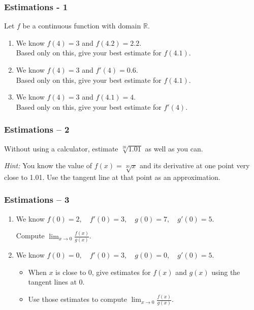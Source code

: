\documentclass[14pt]{beamer}
\begin{document}
\begin{frame}
	\frametitle{Estimations - 1}

	Let $f$ be a continuous function with domain $\mathbb{R}$.

	\vfill

	\begin{enumerate}
		\item We know $f(4)=3$ and $f(4.2)=2.2$. \\ Based only on this, give your best
			estimate for $f(4.1)$.
			\vfill

		\item We know $f(4)=3$ and $f'(4)=0.6$. \\ Based only on this, give your best
			estimate for $f(4.1)$.
			\vfill

		\item We know $f(4)=3$ and $f(4.1) = 4$. \\ Based only on this, give your best
			estimate for $f'(4)$.
	\end{enumerate}

	\vfill
\end{frame}

\begin{frame}
	\frametitle{Estimations -- 2}

	Without using a calculator, estimate $\displaystyle \sqrt[20]{1.01}$ as well as
	you can.

	\emph{Hint:} You know the value of $\displaystyle f(x) = \sqrt[20]{x}$ and its
	derivative at one point very close to 1.01. Use the tangent line at that point
	as an approximation.
\end{frame}

\begin{frame}[t]
	\fontsize{13}{13}\selectfont
	\frametitle{Estimations -- 3}


	\begin{enumerate}
		\item We know \quad $\displaystyle f(0) = 2, \quad f'(0) = 3, \quad g(0) = 7,
			\quad g'(0) = 5.$

			\vspace{.2cm}
			Compute \; $\displaystyle \lim_{x \to 0}\frac{f(x)}{g(x)}$.

			\vfill

		\item We know \quad $\displaystyle f(0) = 0, \quad f'(0) = 3, \quad g(0) = 0,
			\quad g'(0) = 5.$

			\vspace{.2cm}
			\begin{itemize}
				\item When $x$ is close to $0$, give estimates for $\displaystyle f(x)$
					and $\displaystyle g(x)$ using the tangent lines at $0$.

				\item Use those estimates to compute \; $\displaystyle \lim_{x \to 0}\frac{f(x)}{g(x)}$.
			\end{itemize}
	\end{enumerate}

	\vfill
\end{frame}
\end{document}
